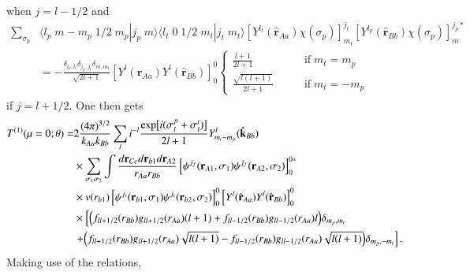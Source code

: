 when $j=l-1/2$ and
\begin{equation}\label{eq143}
 \begin{split}
\sum_{\sigma_p}& \langle l_p \;m-m_p\;1/2\;m_p|j_p\;m\rangle\langle l_t \;0\;1/2\;m_t|j_t\;m_t\rangle \left[Y^{l_t}(\hat{\mathbf{r}}_{Aa})\chi(\sigma_p)\right]^{j_t}_{m_t}\left[Y^{l_p}
    (\hat{\mathbf{r}}_{Bb})\chi(\sigma_p)\right]^{j_p*}_{m}\\
    &=-\frac{\delta_{l_p,l_t}\delta_{j_p,j_t}\delta_{m,m_t}}{\sqrt{2l+1}}
    \left[Y^{l}(\hat{\mathbf{r}}_{Aa})Y^{l}(\hat{\mathbf{r}}_{Bb})\right]^{0}_{0}
    \left\{
\begin{aligned}
\frac{l+1}{2l+1} \qquad &\text{if}\; m_t=m_p\\
\frac{\sqrt{l(l+1)}}{2l+1}\qquad &\text{if} \;m_t=-m_p
\end{aligned}
\right.
 \end{split}
\end{equation}
if $j=l+1/2$. One then gets
\begin{equation}\label{eq144}
 \begin{split}
T^{(1)}(\mu=0;\theta)=&2\frac{(4\pi)^{3/2}}{k_{Aa}k_{Bb}}\sum_{l}i^{-l}
\frac{\exp\bigl[i(\sigma_{l}^p+\sigma_{l}^t)\bigr]}{2l+1}Y_{m_t-m_p}^{l}(\hat{\mathbf{k}}_{Bb})\\
 &\times \sum_{\sigma_1 \sigma_2}\int \frac{d\mathbf{r}_{Cc}d\mathbf{r}_{b1}d\mathbf{r}_{A2}}{r_{Aa}r_{Bb}}\left[ \psi ^{j_f} (\mathbf{r}_{A1},\sigma_1) \psi ^{j_f} (\mathbf{r}_{A2},\sigma_2) \right] _0^{0*}\\
 &\times  v(r_{b1})
\left[ \psi ^{j_i} (\mathbf{r}_{b1},\sigma_1) \psi ^{j_i} (\mathbf{r}_{b2},\sigma_2) \right] _0^{0}
 \left[Y^{l}(\hat{\mathbf{r}}_{Aa})Y^{l}(\hat{\mathbf{r}}_{Bb})\right]^{0}_{0}\\
 &\times \left[\Bigl(f_{ll+1/2}(r_{Bb})g_{ll+1/2}(r_{Aa})(l+1)+f_{ll-1/2}(r_{Bb})g_{ll-1/2}(r_{Aa})l\Bigr)\delta_{m_p,m_t}\right.\\
  &\left.+\Bigl(f_{ll+1/2}(r_{Bb})g_{ll+1/2}(r_{Aa})\sqrt{l(l+1)}-f_{ll-1/2}(r_{Bb})g_{ll-1/2}(r_{Aa})
  \sqrt{l(l+1)}\Bigr)\delta_{m_p,-m_t}\right].\\
 \end{split}
\end{equation}
Making use of the relations,
